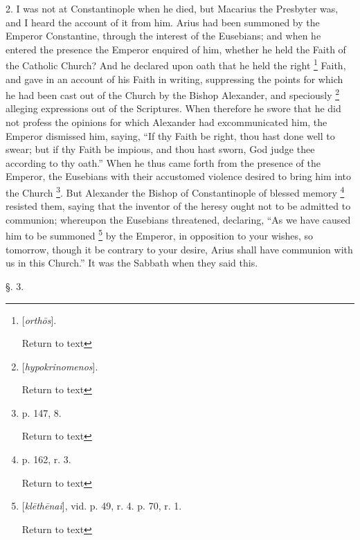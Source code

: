 2. I was not at Constantinople when he died, but
Macarius the Presbyter was, and I heard the account of it from him.
Arius had been summoned by the Emperor Constantine, through the
interest of the Eusebians; and when he entered the presence the
Emperor enquired of him, whether he held the Faith of the Catholic
Church? And he declared upon oath that he held the right \footnote{[\emph{orth\={o}s}].

Return to text} Faith, and gave in an account of his Faith in writing,
suppressing the points for which he had been cast out of the Church by
the Bishop Alexander, and speciously \footnote{[\emph{hypokrinomenos}].

Return to text} alleging expressions out of the Scriptures. When therefore he
swore that he did not profess the opinions for which Alexander had
excommunicated him, the Emperor dismissed him, saying, “If thy Faith
be right, thou hast done well to swear; but if thy Faith be impious,
and thou hast sworn, God judge thee according to thy oath.” When he
thus came forth from the presence of the Emperor, the Eusebians with
their accustomed violence desired to bring him into the Church \footnote{p. 147, 8.

Return to text}. But Alexander the Bishop of Constantinople of blessed
memory \footnote{p. 162, r. 3.

Return to text} resisted them,
saying that the inventor of the heresy ought not to be admitted to
communion; whereupon the Eusebians threatened, declaring, “As we
have caused him to be summoned \footnote{[\emph{kl\={e}th\={e}nai}], vid. p. 49, r. 4. p. 70, r. 1.

Return to text} by the Emperor, in opposition to your wishes, so tomorrow,
though it be contrary to your desire, Arius shall have communion with
us in this Church.” It was the Sabbath when they said this.

§. 3.

